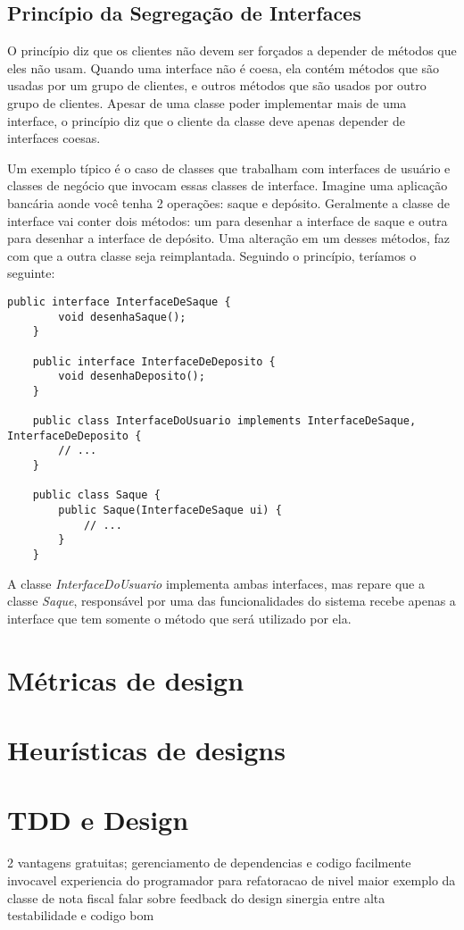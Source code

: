\subsection{Princípio da Segregação de Interfaces}
\label{subsec:isp}

O princípio diz que os clientes não devem ser forçados a depender de métodos que eles não usam. Quando uma interface não é coesa,
ela contém métodos que são usadas por um grupo de clientes, e outros métodos que são usados por outro grupo de clientes. Apesar de uma
classe poder implementar mais de uma interface, o princípio diz que o cliente da classe deve apenas depender de interfaces
coesas.

Um exemplo típico é o caso de classes que trabalham com interfaces de usuário e classes de negócio que invocam essas classes
de interface. Imagine uma aplicação bancária aonde você tenha 2 operações: saque e depósito. Geralmente a classe de interface 
vai conter dois métodos: um para desenhar a interface de saque e outra para desenhar a interface de depósito. Uma alteração em
um desses métodos, faz com que a outra classe seja reimplantada. Seguindo o princípio, teríamos o seguinte:

\begin{lstlisting}[frame=trbl]
	public interface InterfaceDeSaque {
		void desenhaSaque();
	}
	
	public interface InterfaceDeDeposito {
		void desenhaDeposito();
	}
	
	public class InterfaceDoUsuario implements InterfaceDeSaque, InterfaceDeDeposito {
		// ...
	}
	
	public class Saque {
		public Saque(InterfaceDeSaque ui) { 
			// ...
		}
	}
\end{lstlisting}

A classe \textit{InterfaceDoUsuario} implementa ambas interfaces, mas repare que a classe \textit{Saque}, responsável por
uma das funcionalidades do sistema recebe apenas a interface que tem somente o método que será utilizado por ela.

\section{Métricas de design}

\section{Heurísticas de designs}

\section{TDD e Design}
2 vantagens gratuitas; gerenciamento de dependencias e codigo facilmente invocavel
experiencia do programador para refatoracao de nivel maior
exemplo da classe de nota fiscal
falar sobre feedback do design
sinergia entre alta testabilidade e codigo bom
